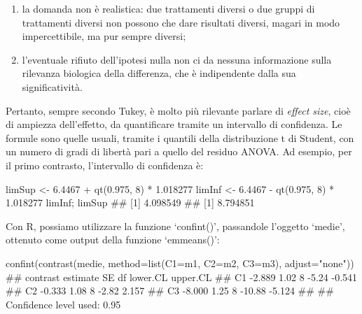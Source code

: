 \documentclass[a4paper,12pt,oneside]{book}
\providecommand{\tightlist}{%
  \setlength{\itemsep}{0pt}\setlength{\parskip}{0pt}}
\newenvironment{Shaded}{}{}
\newcommand{\KeywordTok}[1]{#1}
\newcommand{\DataTypeTok}[1]{#1}
\newcommand{\DecValTok}[1]{#1}
\newcommand{\FloatTok}[1]{#1}
\newcommand{\StringTok}[1]{#1}
\newcommand{\CommentTok}[1]{#1}
\newcommand{\OperatorTok}[1]{#1}
\newcommand{\NormalTok}[1]{#1}
\begin{document}
\begin{enumerate}
\def\labelenumi{\arabic{enumi}.}
\tightlist
\item
  la domanda non è realistica: due trattamenti diversi o due gruppi di trattamenti diversi non possono che dare risultati diversi, magari in modo impercettibile, ma pur sempre diversi;
\item
  l'eventuale rifiuto dell'ipotesi nulla non ci da nessuna informazione sulla rilevanza biologica della differenza, che è indipendente dalla sua significatività.
\end{enumerate}

Pertanto, sempre secondo Tukey, è molto più rilevante parlare di \emph{effect size}, cioè di ampiezza dell'effetto, da quantificare tramite un intervallo di confidenza. Le formule sono quelle usuali, tramite i quantili della distribuzione t di Student, con un numero di gradi di libertà pari a quello del residuo ANOVA. Ad esempio, per il primo contrasto, l'intervallo di confidenza è:

\begin{Shaded}
\begin{Highlighting}[]
\NormalTok{limSup <-}\StringTok{ }\FloatTok{6.4467} \OperatorTok{+}\StringTok{ }\KeywordTok{qt}\NormalTok{(}\FloatTok{0.975}\NormalTok{, }\DecValTok{8}\NormalTok{) }\OperatorTok{*}\StringTok{ }\FloatTok{1.018277}
\NormalTok{limInf <-}\StringTok{ }\FloatTok{6.4467} \OperatorTok{-}\StringTok{ }\KeywordTok{qt}\NormalTok{(}\FloatTok{0.975}\NormalTok{, }\DecValTok{8}\NormalTok{) }\OperatorTok{*}\StringTok{ }\FloatTok{1.018277}
\NormalTok{limInf; limSup}
\CommentTok{## [1] 4.098549}
\CommentTok{## [1] 8.794851}
\end{Highlighting}
\end{Shaded}

Con R, possiamo utilizzare la funzione `confint()', passandole l'oggetto `medie', ottenuto come output della funzione `emmeans()':

\begin{Shaded}
\begin{Highlighting}[]
\KeywordTok{confint}\NormalTok{(}\KeywordTok{contrast}\NormalTok{(medie, }\DataTypeTok{method=}\KeywordTok{list}\NormalTok{(}\DataTypeTok{C1=}\NormalTok{m1, }\DataTypeTok{C2=}\NormalTok{m2, }\DataTypeTok{C3=}\NormalTok{m3), }
           \DataTypeTok{adjust=}\StringTok{"none"}\NormalTok{))}
\CommentTok{##  contrast estimate   SE df lower.CL upper.CL}
\CommentTok{##  C1         -2.889 1.02  8    -5.24   -0.541}
\CommentTok{##  C2         -0.333 1.08  8    -2.82    2.157}
\CommentTok{##  C3         -8.000 1.25  8   -10.88   -5.124}
\CommentTok{## }
\CommentTok{## Confidence level used: 0.95}
\end{Highlighting}
\end{Shaded}
\end{document}
